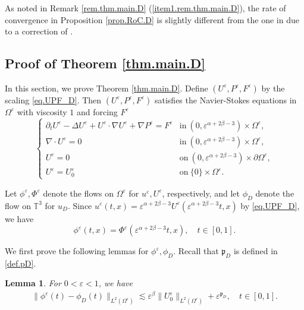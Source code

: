 \documentclass[11pt,a4paper]{article}
\numberwithin{equation}{section}
\newtheorem{lemma}[theorem]{Lemma}
\newcommand{\T}{\mathbb{T}}
\newcommand{\eps}{\varepsilon}
\begin{document}
\begin{remark}\label{rem.prop.RoC.D}
As noted in Remark \ref{rem.thm.main.D} (\ref{item1.rem.thm.main.D}), the rate of convergence in Proposition \ref{prop.RoC.D} is slightly different from the one in \cite[Theorem 1.3]{Hof23} due to a correction of \cite[(3.16)]{Hof23}. 
\end{remark}


    \subsection{Proof of Theorem \ref{thm.main.D}}
    \label{sec.Scaling-Stability.D}


In this section, we prove Theorem \ref{thm.main.D}. Define $(U^\eps, P^\eps, F^\eps)$ by the scaling \eqref{eq.UPF_D}. Then $(U^\eps, P^\eps, F^\eps)$ satisfies the Navier-Stokes equations in $\Omega^{\eps}$ with viscosity $1$ and forcing $F^\eps$ 
\begin{equation}
    \left\{
    \begin{array}{ll}
    \partial_t U^\eps - \Delta U^\eps + U^\eps\cdot\nabla U^\eps + \nabla P^\eps 
    = F^\eps &\mbox{in}\ (0,\eps^{\alpha+2\beta-3})\times\Omega^\eps,\\
    \nabla\cdot U^\eps = 0 &\mbox{in}\ (0,\eps^{\alpha+2\beta-3})\times\Omega^\eps,\\
    U^\eps = 0 &\mbox{on}\ (0,\eps^{\alpha+2\beta-3})\times\partial\Omega^\eps,\\
    U^\eps = U^\eps_0 &\mbox{on}\ \{0\}\times\Omega^\eps.
    \end{array}\right.
\end{equation}


Let $\phi^\eps, \Phi^\eps$ denote the flows on $\Omega^\eps$ for $u^\eps, U^\eps$, respectively, and let $\phi_D$ denote the flow on $\T^3$ for $u_D$. Since $u^\eps(t,x)=\eps^{\alpha+2\beta-3} U^\eps(\eps^{\alpha+2\beta-3} t,x)$ by \eqref{eq.UPF_D}, we have 
\begin{equation}\label{eq.FlowMaps_D}
    \phi^\eps(t,x) = \Phi^\eps(\eps^{\alpha+2\beta-3} t,x), 
    \quad
    t\in [0,1]. 
\end{equation}


We first prove the following lemmas for $\phi^\eps, \phi_D$. Recall that $\mathfrak p_D$ is defined in \eqref{def.pD}. 


\begin{lemma}\label{lem.RoC.phiD}
For $0<\eps<1$, we have
\begin{equation}\label{est1.lem.RoC.phiD}
\begin{split}
    \|\phi^\eps(t) - \phi_D(t)\|_{L^2(\Omega^\eps)}
    \lesssim
    \eps^\beta \|U^\eps_0\|_{L^2(\Omega^\eps)} + \eps^{\mathfrak p_D},
    \quad
    t\in [0,1]. 
\end{split}
\end{equation}
\end{lemma}
\end{document}
